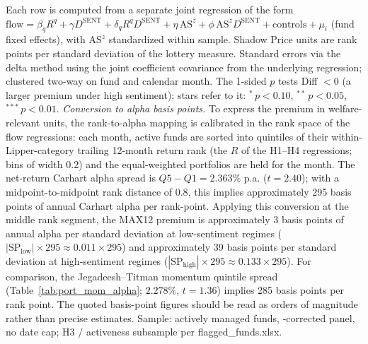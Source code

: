 \begin{table}[!htbp]
\begin{minipage}{\tabletempwidth}
\begin{singlespace}
Each row is computed from a separate joint regression of the form $\text{flow}=\beta_q R^q + \gamma D^{\text{SENT}} + \delta_q R^q D^{\text{SENT}} + \eta\,\text{AS}^z + \phi\,\text{AS}^z D^{\text{SENT}} + \text{controls} + \mu_i$ (fund fixed effects), with $\text{AS}^z$ standardized within sample. Shadow Price units are rank points per standard deviation of the lottery measure. Standard errors via the delta method using the joint coefficient covariance from the underlying regression; clustered two-way on fund and calendar month. The 1-sided $p$ tests Diff $<0$ (a larger premium under high sentiment); stars refer to it: $^{*}\,p<0.10$, $^{**}\,p<0.05$, $^{***}\,p<0.01$.     \textit{Conversion to alpha basis points.} To express the premium in welfare-relevant units, the rank-to-alpha mapping is calibrated in the rank space of the flow regressions: each month, active funds are sorted into quintiles of their within-Lipper-category trailing 12-month return rank (the $R$ of the H1--H4 regressions; bins of width 0.2) and the equal-weighted portfolios are held for the month. The net-return Carhart alpha spread is $Q5-Q1=2.363\%$ p.a. ($t=2.40$); with a midpoint-to-midpoint rank distance of $0.8$, this implies approximately 295 basis points of annual Carhart alpha per rank-point. Applying this conversion at the middle rank segment, the MAX12 premium is approximately 3 basis points of annual alpha per standard deviation at low-sentiment regimes ($|\text{SP}_{\text{low}}|\times 295\approx 0.011\times 295$) and approximately 39 basis points per standard deviation at high-sentiment regimes ($|\text{SP}_{\text{high}}|\times 295\approx 0.133\times 295$). For comparison, the Jegadeesh--Titman momentum quintile spread (Table~\ref{tab:port_mom_alpha}; $2.278\%$, $t=1.36$) implies 285 basis points per rank point. The quoted basis-point figures should be read as orders of magnitude rather than precise estimates.     Sample: actively managed funds, \textcite{Evans2010}-corrected panel, no date cap; H3 / activeness subsample per flagged\_funds.xlsx.
\end{singlespace}
\end{minipage}
\end{table}

